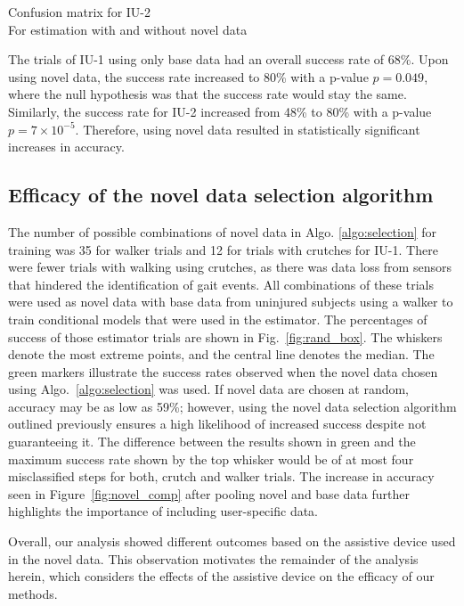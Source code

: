 \begin{table}
	\centering
	\caption{Confusion matrix for IU-2 \\ For estimation with and without novel data }\label{table:comp_table}
	
\end{table}

The trials of IU-1 using only base data had an overall success rate of 68\%. Upon using novel data, the success rate increased to 80\% with a p-value $ p = 0.049$, where the null hypothesis was that the success rate would stay the same. Similarly, the success rate for IU-2 increased from 48\% to 80\% with a p-value $ p = 7\times10^{-5} $. Therefore, using novel data resulted in statistically significant increases in accuracy.

\subsection{Efficacy of the novel data selection algorithm}\label{sec:efficacy}

The number of possible combinations of novel data in Algo. \ref{algo:selection} for training was 35 for walker trials and 12 for trials with crutches for IU-1. There were fewer trials with walking using crutches, as there was data loss from sensors that hindered the identification of gait events. All combinations of these trials were used as novel data with base data from uninjured subjects using a walker to train conditional models that were used in the estimator. The percentages of success of those estimator trials are shown in Fig.~\ref{fig:rand_box}. The whiskers denote the most extreme points, and the central line denotes the median. The green markers illustrate the success rates observed when the novel data chosen using Algo.~\ref{algo:selection} was used. If novel data are chosen at random, accuracy may be as low as 59\%; however, using the novel data selection algorithm outlined previously ensures a high likelihood of increased success despite not guaranteeing it. The difference between the results shown in green and the maximum success rate shown by the top whisker would be of at most four misclassified steps for both, crutch and walker trials. The increase in accuracy seen in Figure~\ref{fig:novel_comp} after pooling novel and base data further highlights the importance of including user-specific data.

Overall, our analysis showed different outcomes based on the assistive device used in the novel data. This observation motivates the remainder of the analysis herein, which considers the effects of the assistive device on the efficacy of our methods. 

